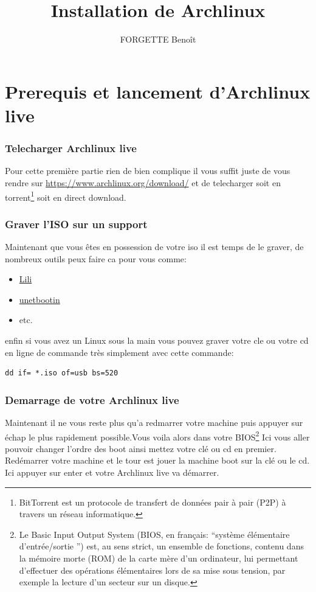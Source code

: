\documentclass[a4paper]{book}
\begin{document}
\title{Installation de Archlinux}
\author{FORGETTE Benoît}
\maketitle


\tableofcontents
\part{Prerequis et lancement d'Archlinux live}
\section{Telecharger Archlinux live}
Pour cette première partie rien de bien complique il vous suffit juste de
vous rendre sur \url{https://www.archlinux.org/download/} et de telecharger
soit en torrent\footnote{BitTorrent est un protocole de transfert de données 
pair à pair (P2P) à travers un réseau informatique.}
soit en direct download.
\section{Graver l'ISO sur un support}
Maintenant que vous êtes en possession de votre iso il est temps de le
graver, de nombreux outils peux faire ca pour vous comme\@:
\begin{itemize} 
  \item \href{http://www.linuxliveusb.com/fr/download}{Lili}
  \item \href{https://unetbootin.github.io/}{unetbootin}
  \item etc.
\end{itemize}
enfin si vous avez un Linux sous la main vous pouvez graver votre cle ou
votre cd en ligne de commande très simplement avec cette commande\@:
\begin{verbatim}
dd if= *.iso of=usb bs=520
\end{verbatim}
\section{Demarrage de votre Archlinux live}
Maintenant il ne vous reste plus qu'a redmarrer votre machine puis appuyer
sur \'echap le plus rapidement possible.Vous voila alors dans votre
BIOS\footnote{Le Basic Input Output System (BIOS, en français:
  ``système élémentaire d'entrée/sortie '') est, au sens strict, un ensemble de
  fonctions, contenu dans la mémoire morte (ROM) de la carte mère d'un
  ordinateur, lui permettant d'effectuer des opérations élémentaires lors de sa
mise sous tension, par exemple la lecture d'un secteur sur un disque.}
Ici vous aller pouvoir changer l'ordre des boot ainsi mettez votre cl\'e ou
cd en premier.\\
Red\'emarrer votre machine et le tour est jouer la machine boot sur la cl\'e ou
le cd.
Ici appuyer sur enter et votre Archlinux live va d\'emarrer.\\
\end{document}
